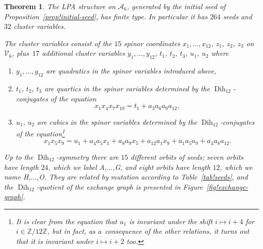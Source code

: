 \documentclass[pdftex]{sigma}
\numberwithin{equation}{section}
\newtheorem{thm}{Theorem}[section]
\theoremstyle{definition}
\newcommand{\ZZ}{\mathbb{Z}}
\DeclareMathOperator{\Dih}{Dih}
\begin{document}
\begin{thm}\label{thm!main-result}
The LPA structure on $\mathcal A_6$, generated by the initial seed of Proposition~{\rm\ref{prop!initial-seed}}, has finite type. In particular it has $264$ seeds and $32$ cluster variables.

The cluster variables consist of the $15$ spinor coordinates $x_1,\ldots,x_{12}$, $z_1$, $z_2$, $z_3$ on $\mathcal V_6$, plus~$17$ additional cluster variables $y_1,\ldots,y_{12}$, $t_1$, $t_2$, $t_3$, $u_1$, $u_2$ where
\begin{enumerate}\itemsep=0pt
\item[$(1)$] $y_1,\ldots,y_{12}$ are quadratics in the spinor variables introduced above,
\item[$(2)$] $t_1$, $t_2$, $t_3$ are quartics in the spinor variables determined by the $\Dih_{12}$-conjugates of the equation
\[ x_1x_4x_7x_{10} = t_1 + a_3a_6a_9a_{12}, \]
\item[$(3)$] $u_1$, $u_2$ are cubics in the spinor variables determined by the $\Dih_{12}$-conjugates of the equation\footnote{It is clear from the equation that $u_1$ is invariant under the shift $i\mapsto i+4$ for $i\in \ZZ/12\ZZ$, but in fact, as a~consequence of the other relations, it turns out that it is invariant under $i\mapsto i+2$ too.}
\[ x_1x_5x_9 = u_1 + a_4a_5x_1 + a_8a_9x_5 + a_{12}a_1x_9 + a_1a_5a_9 + a_4a_8a_{12}. \]
\end{enumerate}
Up to the $\Dih_{12}$-symmetry there are $15$ different orbits of seeds; seven orbits have length $24$, which we label A,$\ldots$,G, and eight orbits have length $12$, which we name H,$\ldots$,O. They are related by mutation according to Table~{\rm\ref{tab!seeds}}, and the $\Dih_{12}$-quotient of the exchange graph is presented in Figure~{\rm\ref{fig!exchange-graph}}.
\end{thm}
\end{document}
